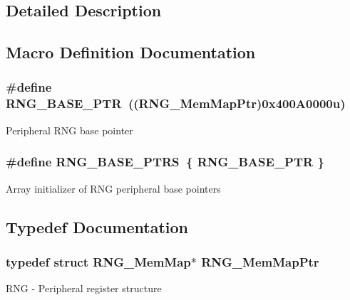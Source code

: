 \subsection{Detailed Description}


\subsection{Macro Definition Documentation}
\hypertarget{group___r_n_g___peripheral_ga799f35e89514a95969257046b5dab042}{}
\subsubsection[{R\+N\+G\+\_\+\+B\+A\+S\+E\+\_\+\+P\+T\+R}]{\setlength{\rightskip}{0pt plus 5cm}\#define R\+N\+G\+\_\+\+B\+A\+S\+E\+\_\+\+P\+T\+R~(({\bf R\+N\+G\+\_\+\+Mem\+Map\+Ptr})0x400\+A0000u)}\label{group___r_n_g___peripheral_ga799f35e89514a95969257046b5dab042}
Peripheral R\+N\+G base pointer \hypertarget{group___r_n_g___peripheral_gafe29fd84164c78d03c9a7a2128caf361}{}
\subsubsection[{R\+N\+G\+\_\+\+B\+A\+S\+E\+\_\+\+P\+T\+R\+S}]{\setlength{\rightskip}{0pt plus 5cm}\#define R\+N\+G\+\_\+\+B\+A\+S\+E\+\_\+\+P\+T\+R\+S~\{ {\bf R\+N\+G\+\_\+\+B\+A\+S\+E\+\_\+\+P\+T\+R} \}}\label{group___r_n_g___peripheral_gafe29fd84164c78d03c9a7a2128caf361}
Array initializer of R\+N\+G peripheral base pointers 

\subsection{Typedef Documentation}
\hypertarget{group___r_n_g___peripheral_gacbf25de72830d12c2d542ff109e3b1df}{}
\subsubsection[{R\+N\+G\+\_\+\+Mem\+Map\+Ptr}]{\setlength{\rightskip}{0pt plus 5cm}typedef struct {\bf R\+N\+G\+\_\+\+Mem\+Map}$\ast$ {\bf R\+N\+G\+\_\+\+Mem\+Map\+Ptr}}\label{group___r_n_g___peripheral_gacbf25de72830d12c2d542ff109e3b1df}
R\+N\+G -\/ Peripheral register structure 